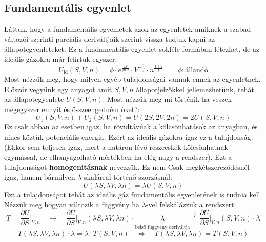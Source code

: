 \documentclass[a4paper,12pt]{article}
\begin{document}
\subsection{Fundamentális egyenlet}
Láttuk, hogy a fundamentális egyenletek azok az egyenletek amiknek a szabad változói szerinti parciális deriváltjaik szerint vissza tudjuk kapni az állapotegyenleteket.
Ez a fundamentális egyenlet sokféle formában létezhet, de az ideális gázokra már felírtuk egyszer:
\begin{equation}
    U_{\text{id}}(S, V, n) = \phi \cdot e^{\frac{2S}{fnR}} \cdot V^{-\frac{2}{f}} \cdot n^{\frac{f + 2}{f}} \qquad \phi: \text{állandó}
\end{equation}
Most nézzük meg, hogy milyen egyéb tulajdonságai vannak ennek az egyenletnek. Először vegyünk egy anyagot amit $S, V, n$ állapotjelzőkkel jellemezhetünk,
tehát az állapotegyenlete $U(S, V, n)$. Most nézzük meg mi történik ha veszek mégegyszer ennyit és összeengedném őket?:
\begin{equation}
    U_1(S, V, n) + U_2(S, V, n) = U(2S, 2V, 2n) = 2 U(S, V, n)
\end{equation}
Ez csak abban az esetben igaz, ha rövidtávúak a kölcsönhatások az anyagban, és nincs köztük potenciális energia. Ezért az ideális gázokra igaz ez a tulajdonság. (Ekkor sem teljesen igaz,
mert a határon lévő részecskék kölcsönhatnak egymással, de elhanyagolható mértékben ha elég nagy a rendszer). Ezt a tulajdonságot \textbf{homogenitásnak} nevezzük. Ez nem Csak
megkétszereződésnél igaz, hanem bármilyen $\lambda$ skalárral történő szorzásnál:
\begin{equation}
    U(\lambda S, \lambda V, \lambda n) = \lambda U(S, V, n)
\end{equation}
Ezt a tulajdonságot tehát az ideális gáz fundamentális egyenletének is tudnia kell. Nézzük meg hogyan változik a függvény ha $\lambda$-vel felskálázzuk a rendszert:
\begin{equation}
    T = \frac{\partial U}{\partial S}\bigg|_{V,n} \quad \to \quad \frac{\partial U}{\partial S}\bigg|_{V,n} (\lambda S, \lambda V, \lambda n) \cdot \underbrace{\lambda}_{\text{belső függvény deriváltja}} \stackrel{?}{=} \frac{\partial U}{\partial S}\bigg|_{V,n} (S, V, n) \cdot \lambda
\end{equation}
\begin{equation}
    T(\lambda S, \lambda V, \lambda n) \cdot \lambda= \lambda \cdot T (S, V, n) \quad \Rightarrow \quad T(\lambda S, \lambda V, \lambda n) = T (S, V, n)
\end{equation}
\end{document}
